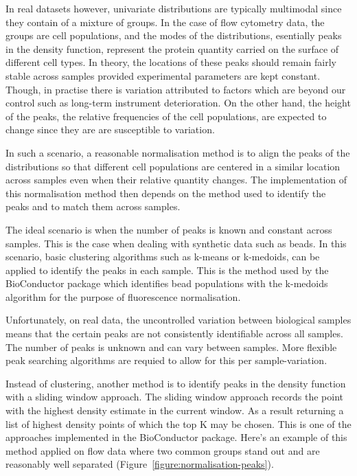 In real datasets however, univariate distributions are typically multimodal since they contain of a mixture of groups.
In the case of flow cytometry data, the groups are cell populations, and the modes of the distributions, esentially peaks in the density function,
represent the protein quantity carried on the surface of different cell types.
In theory, the locations of these peaks should remain fairly stable across samples provided experimental parameters are kept constant.
Though, in practise there is variation attributed to factors which are beyond our control such as long-term instrument deterioration.
On the other hand, the height of the peaks, the relative frequencies of the cell populations, are expected to change since they are
are susceptible to variation.

In such a scenario, a reasonable normalisation method is to align the peaks of the distributions so that different cell populations are centered
in a similar location across samples even when their relative quantity changes.
The implementation of this normalisation method then depends on the method used to identify the peaks and to match them across samples.

The ideal scenario is when the number of peaks is known and constant across samples.
This is the case when dealing with synthetic data such as beads.
In this scenario, basic clustering algorithms such as k-means or k-medoids, can be applied to identify the peaks in each sample.
This is the method used by the  BioConductor package which identifies bead populations with the k-medoids algorithm
for the purpose of fluorescence normalisation.

Unfortunately, on real data, the uncontrolled variation between biological samples means that the certain peaks are not consistently identifiable across all samples.
The number of peaks is unknown and can vary between samples. 
More flexible peak searching algorithms are requied to allow for this per sample-variation.

Instead of clustering, another method is to identify peaks in the density function with a sliding window approach.
The sliding window approach records the point with the highest density estimate in the current window.
As a result returning a list of highest density points of which the top K may be chosen.
This is one of the approaches implemented in the  BioConductor package.
Here's an example of this method applied on flow data where two common groups stand out and are reasonably well separated (Figure~\ref{figure:normalisation-peaks}).

